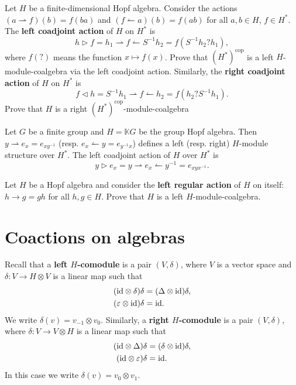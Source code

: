 \begin{exercise}
Let $H$ be a finite-dimensional Hopf algebra. Consider the actions
$(a\rightharpoonup f)(b)=f(ba)$ and $(f\leftharpoonup a)(b)=f(ab)$
for all $a,b\in H$, $f\in H^{*}$. The \textbf{left coadjoint action}
of $H$ on $H^{*}$ is 
\[
h\triangleright f=h_{1}\rightharpoonup f\leftharpoonup S^{-1}h_{2}=f(S^{-1}h_{2}?h_1),
\]
where $f(?)$ means the function $x\mapsto f(x)$. Prove that
$(H^*)^\mathrm{cop}$ is a left $H$-module-coalgebra via the left coadjoint
action. Similarly, the \textbf{right coadjoint action} of $H$ on $H^{*}$ is 
\[
f\triangleleft h=S^{-1}h_{1}\rightharpoonup f\leftharpoonup h_{2}=f(h_2?S^{-1}h_{1}).
\]
Prove that $H$ is a right $(H^*)^\mathrm{cop}$-module-coalgebra 
\end{exercise}

\begin{example}
Let $G$ be a finite group and $H=\mathbb{K}G$ be the group Hopf algebra. Then
$y\rightharpoonup e_{x}=e_{xy^{-1}}$ (resp. $e_{x}\leftharpoonup
y=e_{y^{-1}x}$) defines a left (resp. right) $H$-module structure over $H^{*}$.
The left coadjoint action of $H$ over $H^{*}$ is 
\[
y\triangleright e_{x}=y\rightharpoonup e_{x}\leftharpoonup y^{-1}=e_{xyx^{-1}}.
\]
\end{example}

\begin{exercise}
Let $H$ be a Hopf algebra and consider the \textbf{left regular action} of $H$ on itself:
$h\rightarrow g=gh$ for all
$h,g\in H$. Prove that $H$ is a left $H$-module-coalgebra. 
\end{exercise}

\section{Coactions on algebras}

Recall that a \textbf{left $H$-comodule} is a pair $(V,\delta)$,
where $V$ is a vector space and $\delta:V\to H\otimes V$ is a linear
map such that 
\begin{align*}
(\mathrm{id}\otimes\delta)\delta & =(\Delta\otimes\mathrm{id})\delta,\\
(\varepsilon\otimes\mathrm{id})\delta & =\mathrm{id}.
\end{align*}
We write $\delta(v)=v_{-1}\otimes v_{0}$. Similarly, a \textbf{right
$H$-comodule} is a pair $(V,\delta)$, where $\delta:V\to V\otimes H$
is a linear map such that 
\begin{align*}
(\mathrm{id}\otimes\Delta)\delta & =(\delta\otimes\mathrm{id})\delta,\\
(\mathrm{id}\otimes\varepsilon)\delta & =\mathrm{id}.
\end{align*}
In this case we write $\delta(v)=v_{0}\otimes v_{1}$.

